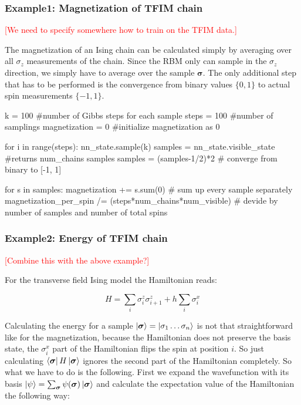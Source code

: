 \documentclass[submission, Phys]{SciPost}
\begin{document}
\subsubsection{Example1: Magnetization of TFIM chain}

\textcolor{red}{[We need to specify somewhere how to train on the TFIM data.]}

The magnetization of an Ising chain can be calculated simply by averaging over all $\sigma_z$ measurements of the chain. Since the RBM only can sample in the $\sigma_z$ direction, we simply have to average over the sample $\bm{\sigma}$. The only additional step that has to be performed is the convergence from binary values $\{0,1  \}$ to actual spin measurements $\{-1 ,1  \}$.

\begin{python}
k = 100 #number of Gibbs steps for each sample
steps = 100 #number of samplings
magnetization = 0 #initialize magnetization as 0

for i in range(steps):
	nn_state.sample(k)
	samples = nn_state.visible_state #returns num_chains samples
	samples = (samples-1/2)*2 # converge from binary to [-1, 1]

	for s in samples: 
		magnetization += s.sum(0) # sum up every sample separately
magnetization_per_spin /= (steps*num_chains*num_visible) # devide by number of samples and number of total spins
\end{python}

\subsubsection{Example2: Energy of TFIM chain}

\textcolor{red}{[Combine this with the above example?]}

For the transverse field Ising model the Hamiltonian reads:

\begin{equation}
H = \sum_i \sigma^z_i \sigma^z_{i+1} + h \sum_i \sigma^x_{i}
\end{equation}

Calculating the energy for a sample $\ket{\bm{\sigma} }= \ket{\sigma_1 \dots  \sigma_n}$ is not that straightforward like for the magnetization, because the Hamiltonian does not preserve the basis state, the $\sigma^x_i$ part of the Hamiltonian flips the spin at position $i$. So just calculating $\bra{\bm{\sigma} } H \ket{\bm{\sigma} }$ ignores the second part of the Hamiltonian completely. So what we have to do is the following. First we expand the wavefunction with its basis $\ket{\psi} = \sum_{\bm{\sigma}} \psi(\bm{\sigma}) \ket{\bm{\sigma}} $ and calculate the expectation value of the Hamiltonian the following way:
\end{document}
